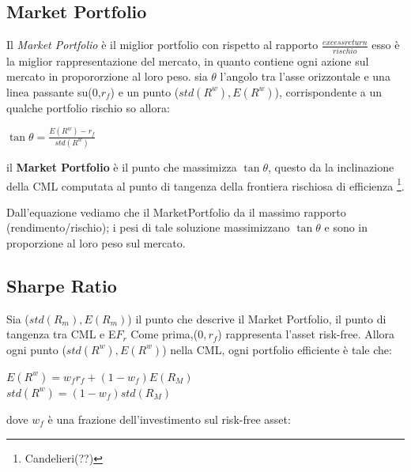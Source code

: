 \documentclass[a4paper,11pt]{report}
\begin{document}
{\subsection{Market Portfolio}	
	Il \emph{Market Portfolio} è il miglior portfolio con rispetto al rapporto ${\frac{excess return}{rischio}}$ \newline
	esso è la miglior rappresentazione del mercato, in quanto contiene ogni azione sul mercato in propororzione al loro peso. \newline
	sia $\theta$ l'angolo tra l'asse orizzontale e una linea passante su(0,$r_f$) e un punto ($std(R^w),E(R^w)$), corrispondente    	 a un qualche portfolio rischio so allora:
\begin{center}
 $\tan{\theta} = {\frac {E(R^w) - r_f}{std(R^w)}} $
\end{center} 
	il \textbf{Market Portfolio} è il punto che massimizza $\tan{\theta}$, questo da la inclinazione della CML computata al punto di tangenza della frontiera rischiosa di efficienza  \footnote{Candelieri(??)}.

	Dall'equazione vediamo che il MarketPortfolio da il massimo rapporto (rendimento/rischio); i pesi di tale soluzione massimizzano 
	$\tan\theta$ e sono in proporzione al loro peso sul mercato.

\newpage
\subsection{Sharpe Ratio}
	Sia ($std(R_m), E(R_m)$) il punto che descrive il Market Portfolio, il punto di tangenza tra CML e E$F_r$ \newline
	Come prima,($0,r_f$) rappresenta l'asset risk-free. Allora ogni punto ($std(R^w),E(R^w)$) nella CML, ogni portfolio efficiente è tale che: 
\begin{center}
	$E(R^w)= w_f r_f + (1-w_f)E(R_M) $ \\
	$std(R^w)=(1-w_f)std(R_M) $ \\
\end{center}
	dove $w_f$ è una frazione dell'investimento sul risk-free asset: 

}
\end{document}
